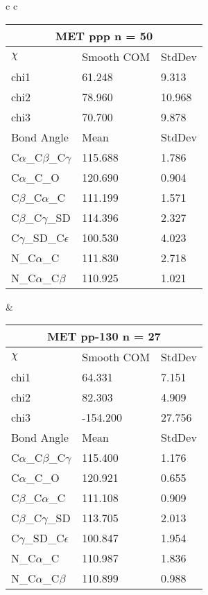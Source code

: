 \begin{longtable}{ c c }

  \begin{tabular}{ l l l }
  \toprule
  \multicolumn{3}{c}{MET \textbf{ppp} n = 50} \\ \toprule
  $\chi$       & Smooth COM & StdDev \\ \midrule
  chi1 & 61.248 & 9.313 \\ 
  chi2 & 78.960 & 10.968 \\ 
  chi3 & 70.700 & 9.878 \\ \midrule
  Bond Angle   & Mean     & StdDev \\ \midrule
  C$\alpha$\_C$\beta$\_C$\gamma$ & 115.688 & 1.786\\
  C$\alpha$\_C\_O & 120.690 & 0.904\\
  C$\beta$\_C$\alpha$\_C & 111.199 & 1.571\\
  C$\beta$\_C$\gamma$\_SD & 114.396 & 2.327\\
  C$\gamma$\_SD\_C$\epsilon$ & 100.530 & 4.023\\
  N\_C$\alpha$\_C & 111.830 & 2.718\\
  N\_C$\alpha$\_C$\beta$ & 110.925 & 1.021\\
  \bottomrule
  \end{tabular}
  &
  \begin{tabular}{ l l l }
  \toprule
  \multicolumn{3}{c}{MET \textbf{pp-130} n = 27} \\ \toprule
  $\chi$       & Smooth COM & StdDev \\ \midrule
  chi1 & 64.331 & 7.151 \\ 
  chi2 & 82.303 & 4.909 \\ 
  chi3 & -154.200 & 27.756 \\ \midrule
  Bond Angle   & Mean     & StdDev \\ \midrule
  C$\alpha$\_C$\beta$\_C$\gamma$ & 115.400 & 1.176\\
  C$\alpha$\_C\_O & 120.921 & 0.655\\
  C$\beta$\_C$\alpha$\_C & 111.108 & 0.909\\
  C$\beta$\_C$\gamma$\_SD & 113.705 & 2.013\\
  C$\gamma$\_SD\_C$\epsilon$ & 100.847 & 1.954\\
  N\_C$\alpha$\_C & 110.987 & 1.836\\
  N\_C$\alpha$\_C$\beta$ & 110.899 & 0.988\\
  \bottomrule
  \end{tabular}
  \\

\end{longtable}

